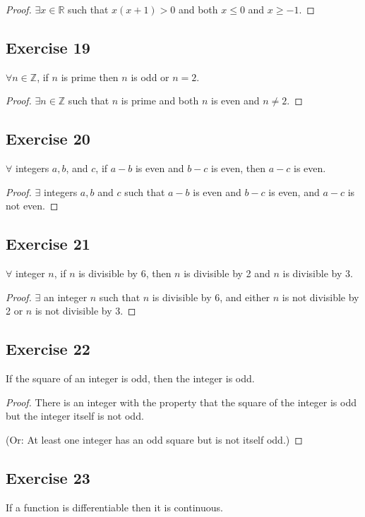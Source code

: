 \documentclass[14pt]{extarticle}
\newcommand{\R}{\mathbb{R}}
\newcommand{\Z}{\mathbb{Z}}
\newcommand{\fa}{\forall}
\newcommand{\te}{\exists}
\begin{document}
\begin{proof}
    $\te x \in \R$ such that $x(x + 1) > 0$ and both $x \leq 0$ and $x \geq -1$.
\end{proof}

\subsection{Exercise 19}
$\fa n \in \Z$, if $n$ is prime then $n$ is odd or $n = 2$.

\begin{proof}
    $\te n \in \Z$ such that $n$ is prime and both $n$ is even and $n \neq 2$.
\end{proof}

\subsection{Exercise 20}
$\fa$ integers $a, b$, and $c$, if $a - b$ is even and $b - c$ is even, then $a - c$ is even.

\begin{proof}
    $\te$ integers $a, b$ and $c$ such that $a - b$ is even and $b - c$ is even, and $a - c$ is not even.
\end{proof}

\subsection{Exercise 21}
$\fa$ integer $n$, if $n$ is divisible by 6, then $n$ is divisible by 2 and $n$ is divisible by 3.

\begin{proof}
    $\te$ an integer $n$ such that $n$ is divisible by 6, and either $n$ is not divisible by 2 or $n$ is not divisible by 3.
\end{proof}

\subsection{Exercise 22}
If the square of an integer is odd, then the integer is odd.

\begin{proof}
    There is an integer with the property that the square of the integer is odd but the integer itself is not odd.

    (Or: At least one integer has an odd square but is not itself odd.)
\end{proof}

\subsection{Exercise 23}
If a function is differentiable then it is continuous.
\end{document}
